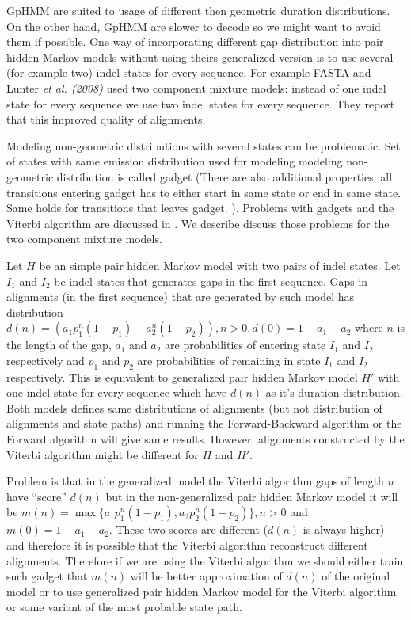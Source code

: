 GpHMM are suited to usage of different then geometric duration distributions.
On the other hand, GpHMM are slower to decode so we might want to avoid them if
possible.  One way of incorporating different gap distribution into pair hidden
Markov models without using theirs generalized version is to use several (for
example two) indel states for every sequence. For example FASTA \cite{} and
Lunter {\it et al. (2008)} used two component mixture models: instead of one
indel state for every sequence we use two indel states for every sequence. They
report that this improved quality of alignments.

Modeling non-geometric distributions with several states can be problematic. Set
of states with same emission distribution used for modeling modeling
non-geometric distribution is called gadget (There are also additional
properties: all transitions entering gadget has to either start in same state or
end in same state. Same holds for transitions that leaves gadget. ). Problems
with gadgets and the Viterbi algorithm are discussed in
\cite{TomasovaDizertacka}. We describe discuss those problems for the two
component mixture models.

Let $H$ be an simple pair hidden Markov model with two pairs of indel states.
Let $I_1$ and $I_2$ be indel states that generates gaps in the first sequence.
Gaps in alignments (in the first sequence) that are generated by such model has
distribution $d(n)=(a_1p_1^n(1-p_1)+a_2^n(1-p_2)), n>0, d(0)=1-a_1-a_2$ where
$n$ is the length of the gap, $a_1$ and $a_2$ are probabilities of entering
state $I_1$ and $I_2$ respectively and $p_1$ and $p_2$ are probabilities of
remaining in state $I_1$ and $I_2$ respectively. This is equivalent to
generalized pair hidden Markov model $H'$ with one indel state for every
sequence which have $d(n)$ as it's duration distribution. Both models defines
same distributions of alignments (but not distribution of alignments and state
paths) and running the Forward-Backward algorithm or the Forward algorithm will 
give same results. However, alignments constructed by the Viterbi algorithm
might be different for $H$ and $H'$.

Problem is that in the generalized model the Viterbi algorithm gaps of length
$n$ have ``score'' $d(n)$ but in the non-generalized pair hidden Markov model it
will be $m(n)=\max\{a_1p_1^n(1-p_1),a_2p_2^n(1-p_2)\}, n>0$ and
$m(0)=1-a_1-a_2$.  These two scores are different ($d(n)$ is always higher) and
therefore it is possible that the Viterbi algorithm reconstruct different
alignments. Therefore if we are using the Viterbi algorithm we should either
train such gadget that $m(n)$ will be better approximation of $d(n)$ of the
original model or to use generalized pair hidden Markov model for the Viterbi
algorithm or some variant of the most probable state path.


